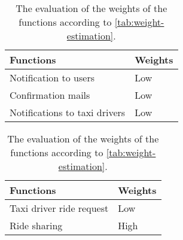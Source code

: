 \begin{table}[h]
\begin{subtable}{\textwidth}
    \centering
    \begin{tabular}{| l | l |}
        \hline
        \textbf{Functions} & \textbf{Weights} \\
        \hline
        Notification to users & Low\\
        Confirmation mails & Low\\
        Notifications to taxi drivers & Low\\
        \hline
    \end{tabular}
    \caption{Computed weights for EOs}
\end{subtable}

\vspace{2em}

\begin{subtable}{\textwidth}
    \centering
    \begin{tabular}{| l | l |}
        \hline
        \textbf{Functions} & \textbf{Weights} \\
        \hline
        Taxi driver ride request & Low\\
        Ride sharing & High\\
        \hline
    \end{tabular}
    \caption{Computed weights for EQs}
\end{subtable}
\caption{The evaluation of the weights of the functions according to \autoref{tab:weight-estimation}.}
\label{tab:computed-weights}
\end{table}

